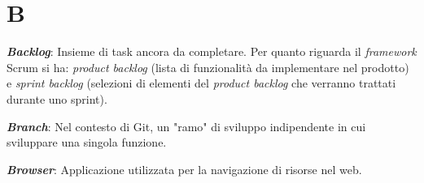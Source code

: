 \documentclass[5pt]{article}
\begin{document}
\section*{B}
\begin{flushleft}
	
\textbf{\textit{Backlog}}: Insieme di task ancora da completare. Per quanto riguarda il \textit{framework} Scrum si ha: \textit{product backlog} (lista di funzionalità da implementare nel prodotto) e \textit{sprint backlog} (selezioni di elementi del \textit{product backlog} che verranno trattati durante uno sprint).\newline
	
\textbf{\textit{Branch}}: Nel contesto di Git, un "ramo" di sviluppo indipendente in cui sviluppare una singola funzione.\newline
	
\textbf{\textit{Browser}}: Applicazione utilizzata per la navigazione di risorse nel web. 	
	
\end{flushleft}

\pagebreak
\end{document}

